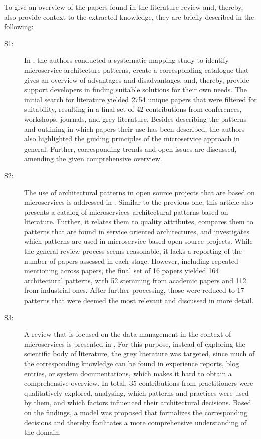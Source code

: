 \documentclass{bmcart}
\begin{document}
To give an overview of the papers found in the literature review and, thereby, also provide context to the extracted knowledge, they are briefly described in the following:

\begin{description}
  \item[S1:] In \cite{Taibi.2018}, the authors conducted a systematic mapping study to identify microservice architecture patterns, create a corresponding catalogue that gives an overview of advantages and disadvantages, and, thereby, provide support developers in finding suitable solutions for their own needs. The initial search for literature yielded 2754 unique papers that were filtered for suitability, resulting in a final set of 42 contributions from conferences, workshops, journals, and grey literature. Besides describing the patterns and outlining in which papers their use has been described, the authors also highlighted the guiding principles of the microservice approach in general. Further, corresponding trends and open issues are discussed, amending the given comprehensive overview.
  \item[S2:] The use of architectural patterns in open source projects that are based on microservices is addressed in \cite{Marquez.2018}. Similar to the previous one, this article also presents a catalog of microservices architectural patterns based on literature. Further, it relates them to quality attributes, compares them to patterns that are found in service oriented architectures, and investigates which patterns are used in microservice-based open source projects. While the general review process seems reasonable, it lacks a reporting of the number of papers assessed in each stage. However, including repeated mentioning across papers, the final set of 16 papers yielded 164 architectural patterns, with 52 stemming from academic papers and 112 from industrial ones. After further processing, those were reduced to 17 patterns that were deemed the most relevant and discussed in more detail.
  \item[S3:] A review that is focused on the data management in the context of microservices is presented in \cite{Ntentos.2019}. For this purpose, instead of exploring the scientific body of literature, the grey literature was targeted, since much of the corresponding knowledge can be found in experience reports, blog entries, or system documentations, which makes it hard to obtain a comprehensive overview. In total, 35 contributions from practitioners were qualitatively explored, analysing, which patterns and practices were used by them, and which factors influenced their architectural decisions. Based on the findings, a model was proposed that formalizes the corresponding decisions and thereby facilitates a more comprehensive understanding of the domain.

\end{description}
\end{document}
